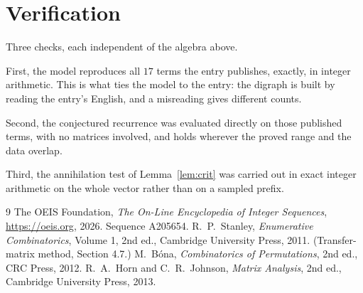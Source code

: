 \documentclass[11pt,a4paper]{article}
\theoremstyle{plain}
\theoremstyle{definition}
\begin{document}
\section{Verification}

Three checks, each independent of the algebra above.

First, the model reproduces all $17$ terms the entry publishes, exactly, in integer
arithmetic. This is what ties the model to the entry: the digraph is built by reading the
entry's English, and a misreading gives different counts.

Second, the conjectured recurrence was evaluated directly on those published terms, with no
matrices involved, and holds wherever the proved range and the data overlap.

Third, the annihilation test of Lemma~\ref{lem:crit} was carried out in exact integer
arithmetic on the whole vector rather than on a sampled prefix.

\begin{thebibliography}{9}
 The OEIS Foundation, \emph{The On-Line Encyclopedia of Integer
Sequences}, \url{https://oeis.org}, 2026. Sequence A205654.
 R.~P.~Stanley, \emph{Enumerative Combinatorics}, Volume 1, 2nd ed.,
Cambridge University Press, 2011. (Transfer-matrix method, Section 4.7.)
 M.~B\'ona, \emph{Combinatorics of Permutations}, 2nd ed., CRC
Press, 2012.
 R.~A.~Horn and C.~R.~Johnson, \emph{Matrix Analysis}, 2nd ed., Cambridge
University Press, 2013.
\end{thebibliography}
\end{document}
